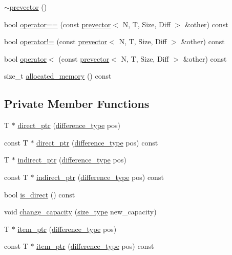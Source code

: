 \begin{DoxyCompactItemize}
\item 
\mbox{\hyperlink{classprevector_a507bc6d153e291d93c885162e3a3a8f7}{$\sim$prevector}} ()
\item 
bool \mbox{\hyperlink{classprevector_a6de6f6aff0a0ca527754020dbb26f7ab}{operator==}} (const \mbox{\hyperlink{classprevector}{prevector}}$<$ N, T, Size, Diff $>$ \&other) const
\item 
bool \mbox{\hyperlink{classprevector_ab82592ccb4e1434025472492549e0c6d}{operator!=}} (const \mbox{\hyperlink{classprevector}{prevector}}$<$ N, T, Size, Diff $>$ \&other) const
\item 
bool \mbox{\hyperlink{classprevector_aa599ca1a3ab1fef2736b831ffed19d04}{operator$<$}} (const \mbox{\hyperlink{classprevector}{prevector}}$<$ N, T, Size, Diff $>$ \&other) const
\item 
size\+\_\+t \mbox{\hyperlink{classprevector_ad4828b9a087bccd2f7f45dbbcf7cafe7}{allocated\+\_\+memory}} () const
\end{DoxyCompactItemize}
\subsection*{Private Member Functions}
\begin{DoxyCompactItemize}
\item 
T $\ast$ \mbox{\hyperlink{classprevector_a20150a43dd87c33f0e855a55bd3418e8}{direct\+\_\+ptr}} (\mbox{\hyperlink{classprevector_a34ad7f610eefb33a8db9161cadf15dbe}{difference\+\_\+type}} pos)
\item 
const T $\ast$ \mbox{\hyperlink{classprevector_a6b64218000ca976867bc26d9ae1de8f8}{direct\+\_\+ptr}} (\mbox{\hyperlink{classprevector_a34ad7f610eefb33a8db9161cadf15dbe}{difference\+\_\+type}} pos) const
\item 
T $\ast$ \mbox{\hyperlink{classprevector_ae3343cc65be9fd678b4a6f8305624de6}{indirect\+\_\+ptr}} (\mbox{\hyperlink{classprevector_a34ad7f610eefb33a8db9161cadf15dbe}{difference\+\_\+type}} pos)
\item 
const T $\ast$ \mbox{\hyperlink{classprevector_a50726bfa612cd65bb8bbee9a22942ced}{indirect\+\_\+ptr}} (\mbox{\hyperlink{classprevector_a34ad7f610eefb33a8db9161cadf15dbe}{difference\+\_\+type}} pos) const
\item 
bool \mbox{\hyperlink{classprevector_a933e204a7e29c6bbc85479d023c00ff8}{is\+\_\+direct}} () const
\item 
void \mbox{\hyperlink{classprevector_a0e673654d3b7d8d6f79534e17f68741a}{change\+\_\+capacity}} (\mbox{\hyperlink{classprevector_a7e0da95e6d1c878f6eeb572f4fc12524}{size\+\_\+type}} new\+\_\+capacity)
\item 
T $\ast$ \mbox{\hyperlink{classprevector_a59f1d7bcbc751cfa0faddd7ffa184846}{item\+\_\+ptr}} (\mbox{\hyperlink{classprevector_a34ad7f610eefb33a8db9161cadf15dbe}{difference\+\_\+type}} pos)
\item 
const T $\ast$ \mbox{\hyperlink{classprevector_a519b06f5a6fc5c9dce4c0bb1b0d985b7}{item\+\_\+ptr}} (\mbox{\hyperlink{classprevector_a34ad7f610eefb33a8db9161cadf15dbe}{difference\+\_\+type}} pos) const
\end{DoxyCompactItemize}
